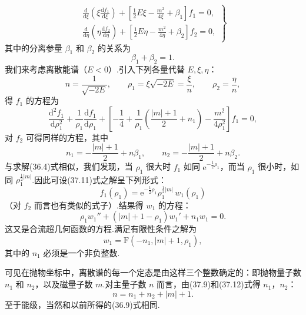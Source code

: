 \begin{equation}
\left.\begin{aligned}
  \frac{\mathrm{d}}{\mathrm{d}\xi}\left(\xi\frac{\mathrm{d}f_1}{\mathrm{d}\xi}\right)
  +\left[\frac{1}{2}E\xi-\frac{m^2}{4\xi}+\beta_1\right]f_1=0,\\
  \frac{\mathrm{d}}{\mathrm{d}\eta}\left(\eta\frac{\mathrm{d}f_2}{\mathrm{d}\eta}\right)
  +\left[\frac{1}{2}E\eta-\frac{m^2}{4\eta}+\beta_2\right]f_2=0,
\end{aligned}\right\}
\end{equation}
其中的分离参量 $\beta_1$ 和 $\beta_2$ 的关系为
\begin{equation}
  \beta_1+\beta_2=1.
\end{equation}
我们来考虑离散能谱（$E<0$）.引入下列各量代替 $E,\xi,\eta$：
\begin{equation}
  n=\frac{1}{\sqrt{-2E}},\qquad
  \rho_1=\xi\sqrt{-2E}=\frac{\xi}{n},\qquad
  \rho_2=\frac{\eta}{n},
\end{equation}
得 $f_1$ 的方程为
\begin{equation}
  \frac{\mathrm{d}^2f_1}{\mathrm{d}\rho_1^2}
  +\frac{1}{\rho_1}\frac{\mathrm{d}f_1}{\mathrm{d}\rho_1}
  +\left[-\frac{1}{4}+\frac{1}{\rho_1}\left(\frac{|m|+1}{2}+n_1\right)
  -\frac{m^2}{4\rho_1^2}\right]f_1=0,
\end{equation}
对 $f_2$ 可得同样的方程，其中
\begin{equation}
  n_1=-\frac{|m|+1}{2}+n\beta_1,\qquad
  n_2=-\frac{|m|+1}{2}+n\beta_2.
\end{equation}
与求解(36.4)式相似，我们发现，当 $\rho_1$ 很大时 $f_1$ 如同 $\mathrm{e}^{-\frac{1}{2}\rho_1}$，而当 $\rho_1$ 很小时，如同 $\rho_1^{\frac{1}{2}|m|}$.因此可设(37.11)式之解呈下列形式：
\begin{equation*}
  f_1(\rho_1)=\mathrm{e}^{-\frac{1}{2}\rho_1}\rho_1^{\frac{1}{2}|m|}\,w_1(\rho_1)
\end{equation*}
（对 $f_2$ 而言也有类似的式子）.结果得 $w_1$ 的方程：
\begin{equation*}
  \rho_1w_1''+(|m|+1-\rho_1)w_1'+n_1w_1=0.
\end{equation*}
这又是合流超几何函数的方程.满足有限性条件之解为
\begin{equation*}
  w_1=\mathrm{F}(-n_1,|m|+1,\rho_1),
\end{equation*}
其中的 $n_1$ 必须是一个非负整数.

可见在抛物坐标中，离散谱的每一个定态是由这样三个整数确定的：即抛物量子数 $n_1$ 和 $n_2$，以及磁量子数 $m$.对主量子数 $n$ 而言，由(37.9)和(37.12)式得 $n_1$，$n_2$：
\begin{equation}
  n=n_1+n_2+|m|+1.
\end{equation}
至于能级，当然和以前所得的(36.9)式相同.

